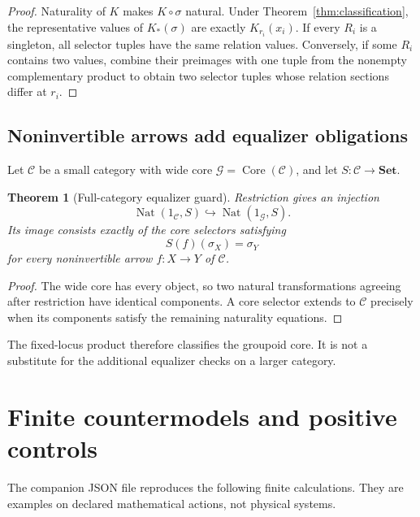 \documentclass[11pt]{article}
\newtheorem{theorem}{Theorem}
\theoremstyle{definition}
\newcommand{\G}{\mathcal G}
\newcommand{\C}{\mathcal C}
\newcommand{\Nat}{\operatorname{Nat}}
\begin{document}
\begin{proof}
Naturality of \(K\) makes \(K\circ\sigma\) natural.  Under
Theorem~\ref{thm:classification}, the representative values of
\(K_*(\sigma)\) are exactly \(K_{r_i}(x_i)\).  If every \(R_i\) is a
singleton, all selector tuples have the same relation values.  Conversely,
if some \(R_i\) contains two values, combine their preimages with one tuple
from the nonempty complementary product to obtain two selector tuples whose
relation sections differ at \(r_i\).
\end{proof}

\subsection{Noninvertible arrows add equalizer obligations}

Let \(\C\) be a small category with wide core \(\G=\operatorname{Core}(\C)\),
and let \(S:\C\to\mathbf{Set}\).

\begin{theorem}[Full-category equalizer guard]
\label{prop:equalizer}
Restriction gives an injection
\[
  \Nat(1_{\C},S)\hookrightarrow\Nat(1_{\G},S).
\]
Its image consists exactly of the core selectors satisfying
\[
  S(f)(\sigma_X)=\sigma_Y
\]
for every noninvertible arrow \(f:X\to Y\) of \(\C\).
\end{theorem}

\begin{proof}
The wide core has every object, so two natural transformations agreeing after
restriction have identical components.  A core selector extends to
\(\C\) precisely when its components satisfy the remaining naturality
equations.
\end{proof}

The fixed-locus product therefore classifies the groupoid core.  It is not a
substitute for the additional equalizer checks on a larger category.

\section{Finite countermodels and positive controls}

The companion JSON file reproduces the following finite calculations.  They
are examples on declared mathematical actions, not physical systems.
\end{document}
